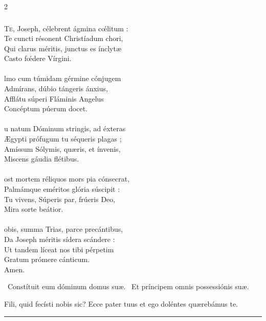 \documentclass[9pt,twoside]{extarticle}
\begin{document}
\begin{multicols}{2}
{{\subsubsection*{\center {}}
\lettrine{T}e, Joseph, célebrent ágmina cœ́litum :\\
Te cuncti résonent Christíadum chori,\\
Qui clarus méritis, junctus es ínclytæ\\
Casto fœ́dere Vírgini.\\
\\
lmo cum túmidam gérmine cónjugem\\
Admírans, dúbio tángeris ánxius,\\
Afflátu súperi Fláminis Angelus\\
Concéptum púerum docet.\\
\\
u natum Dóminum stringis, ad éxteras\\
Ægypti prófugum tu séqueris plagas ;\\
Amíssum Sólymis, quæris, et ínvenis,\\
Miscens gáudia flétibus.\\
\\
ost mortem réliquos mors pia cónsecrat,\\
Palmámque eméritos glória súscipit :\\
Tu vivens, Súperis par, frúeris Deo,\\
Mira sorte beátior.\\
\\
obis, summa Trias, parce precántibus,\\
Da Joseph méritis sídera scándere :\\
Ut tandem líceat nos tibi pérpetim\\
Gratum prómere cánticum.\\
Amen.

\begin{tightlist}{}
\item {}~Constítuit eum dóminum domus suæ. ~Et príncipem omnis possessiónis suæ.
\item {} Fili, quid fecísti nobis sic? Ecce pater tuus et ego doléntes quærebámus te.
\end{tightlist}

\begin{center}\textcolor{red}{\rule{\linewidth}{0.5pt}} \end{center}

}}
\end{multicols}
\end{document}

